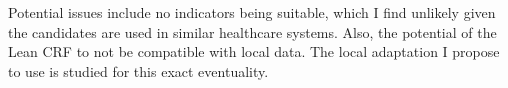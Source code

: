 Potential issues include no indicators being suitable, which I find unlikely given the candidates are used in similar healthcare systems. Also, the potential of the Lean CRF to not be compatible with local data. The local adaptation I propose to use is studied for this exact eventuality.

